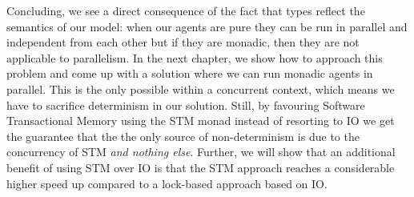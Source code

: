 Concluding, we see a direct consequence of the fact that types reflect the semantics of our model: when our agents are pure they can be run in parallel and independent from each other but if they are monadic, then they are not applicable to parallelism. In the next chapter, we show how to approach this problem and come up with a solution where we can run monadic agents in parallel. This is the only possible within a concurrent context, which means we have to sacrifice determinism in our solution. Still, by favouring Software Transactional Memory using the STM monad instead of resorting to IO we get the guarantee that the the only source of non-determinism is due to the concurrency of STM \textit{and nothing else}. Further, we will show that an additional benefit of using STM over IO is that the STM approach reaches a considerable higher speed up compared to a lock-based approach based on IO. 